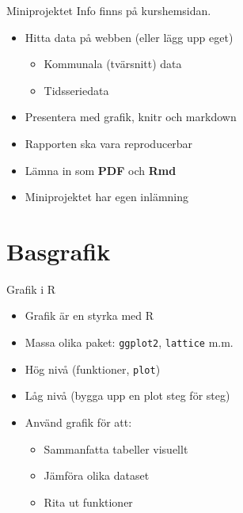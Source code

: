 \documentclass[
  11pt,
  ignorenonframetext,
  handout]{beamer}
\providecommand{\tightlist}{%
  \setlength{\itemsep}{0pt}\setlength{\parskip}{0pt}}
\newcommand\imp[1]{\alert{\textbf{#1}}}
\begin{document}
\begin{frame}{Miniprojektet}
\label{miniprojektet}
Info finns på kurshemsidan.

\begin{itemize}
\tightlist
\item
  Hitta data på webben (eller lägg upp eget)

  \begin{itemize}
  \tightlist
  \item
    Kommunala (tvärsnitt) data
  \item
    Tidsseriedata
  \end{itemize}
\item
  Presentera med grafik, knitr och markdown
\item
  Rapporten ska vara reproducerbar
\item
  Lämna in som \imp{PDF} och \imp{Rmd}
\item
  Miniprojektet har egen inlämning
\end{itemize}
\end{frame}

\section{Basgrafik}\label{basgrafik}

\begin{frame}{Grafik i R}
\label{grafik-i-r}
\begin{itemize}
\tightlist
\item
  Grafik är en styrka med R
\item
  Massa olika paket: \texttt{ggplot2}, \texttt{lattice} m.m.
\item
  Hög nivå (funktioner, \texttt{plot})
\item
  Låg nivå (bygga upp en plot steg för steg)
\item
  Använd grafik för att:

  \begin{itemize}
  \tightlist
  \item
    Sammanfatta tabeller visuellt
  \item
    Jämföra olika dataset
  \item
    Rita ut funktioner
  \end{itemize}
\end{itemize}
\end{frame}
\end{document}
